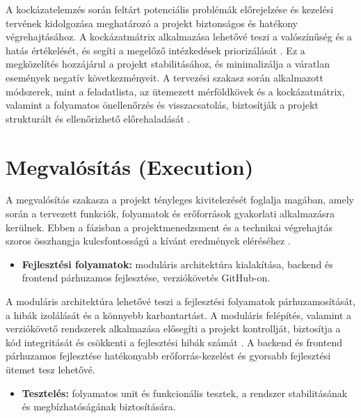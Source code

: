 A kockázatelemzés során feltárt potenciális problémák előrejelzése és kezelési tervének kidolgozása meghatározó a projekt biztonságos és hatékony végrehajtásához. 
A kockázatmátrix alkalmazása lehetővé teszi a valószínűség és a hatás értékelését, és segíti a megelőző intézkedések priorizálását \cite{Kovacs2016,Kaposi2019}. 
Ez a megközelítés hozzájárul a projekt stabilitásához, és minimalizálja a váratlan események negatív következményeit.
A tervezési szakasz során alkalmazott módszerek, mint a feladatlista, az ütemezett mérföldkövek és a kockázatmátrix, 
valamint a folyamatos önellenőrzés és visszacsatolás, biztosítják a projekt strukturált és ellenőrizhető előrehaladását \cite{Hajdu2014,Szalay2018}.


\section{Megvalósítás (Execution)}

A megvalósítás szakasza a projekt tényleges kivitelezését foglalja magában, amely során a tervezett funkciók, 
folyamatok és erőforrások gyakorlati alkalmazásra kerülnek. Ebben a fázisban a projektmenedzsment 
és a technikai végrehajtás szoros összhangja kulcsfontosságú a kívánt eredmények eléréséhez \cite{Hajdu2014,Szalay2018,Kaposi2019}.

\begin{itemize}
    \item \textbf{Fejlesztési folyamatok:} moduláris architektúra kialakítása, backend és frontend párhuzamos fejlesztése, verziókövetés GitHub-on.
\end{itemize}

A moduláris architektúra lehetővé teszi a fejlesztési folyamatok párhuzamosítását, a hibák izolálását és a könnyebb karbantartást. 
A moduláris felépítés, valamint a verziókövető rendszerek alkalmazása elősegíti 
a projekt kontrollját, biztosítja a kód integritását és csökkenti a fejlesztési hibák számát \cite{Kovacs2016,Kaposi2019}. 
A backend és frontend párhuzamos fejlesztése hatékonyabb erőforrás-kezelést és gyorsabb fejlesztési ütemet tesz lehetővé.

\begin{itemize}
    \item \textbf{Tesztelés:} folyamatos unit és funkcionális tesztek, a rendszer stabilitásának és megbízhatóságának biztosítására.
\end{itemize}

